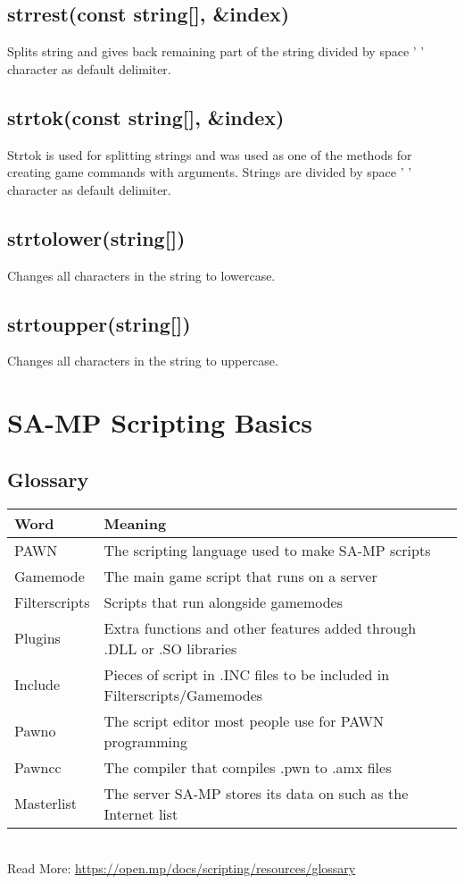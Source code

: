 \documentclass{article}
\begin{document}
\subsection{strrest(const string[], \&index)}
Splits string and gives back remaining part of the string divided by space ' ' character as default delimiter.

\subsection{strtok(const string[], \&index)}
Strtok is used for splitting strings and was used as one of the methods for creating game commands with arguments. Strings are divided by space ' ' character as default delimiter.

\subsection{strtolower(string[])}
Changes all characters in the string to lowercase.

\subsection{strtoupper(string[])}
Changes all characters in the string to uppercase.



\newpage
\section{SA-MP Scripting Basics}

\subsection{Glossary}
\begin{tabular}{ |l|l| } 
\hline
Word & Meaning \\
\hline
PAWN & The scripting language used to make SA-MP scripts \\
Gamemode & The main game script that runs on a server \\
Filterscripts & Scripts that run alongside gamemodes \\
Plugins & Extra functions and other features added through .DLL or .SO libraries \\
Include & Pieces of script in .INC files to be included in Filterscripts/Gamemodes \\
Pawno & The script editor most people use for PAWN programming \\
Pawncc & The compiler that compiles .pwn to .amx files \\
Masterlist & The server SA-MP stores its data on such as the Internet list \\
\hline
\end{tabular}
\bigskip
\\Read More: \url{https://open.mp/docs/scripting/resources/glossary}
\end{document}
